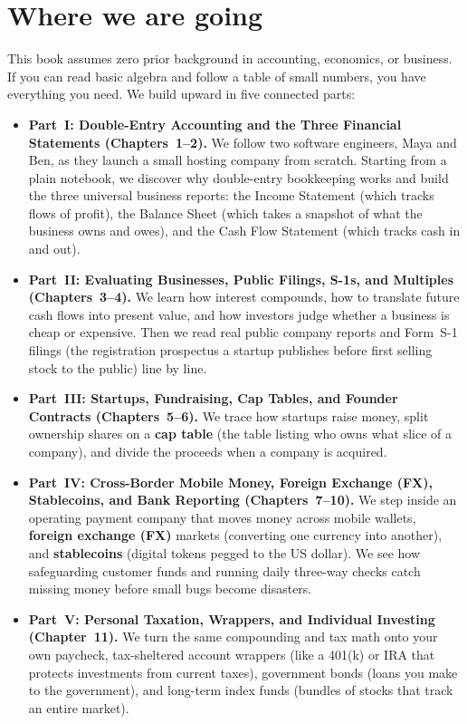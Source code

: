 \section*{Where we are going}

This book assumes zero prior background in accounting, economics, or business. If you can read basic algebra and follow a table of small numbers, you have everything you need. We build upward in five connected parts:

\begin{itemize}
  \item \textbf{Part~I: Double-Entry Accounting and the Three Financial Statements (Chapters~1--2).} We follow two software engineers, Maya and Ben, as they launch a small hosting company from scratch. Starting from a plain notebook, we discover why double-entry bookkeeping works and build the three universal business reports: the Income Statement (which tracks flows of profit), the Balance Sheet (which takes a snapshot of what the business owns and owes), and the Cash Flow Statement (which tracks cash in and out).
  \item \textbf{Part~II: Evaluating Businesses, Public Filings, S-1s, and Multiples (Chapters~3--4).} We learn how interest compounds, how to translate future cash flows into present value, and how investors judge whether a business is cheap or expensive. Then we read real public company reports and Form~S-1 filings (the registration prospectus a startup publishes before first selling stock to the public) line by line.
  \item \textbf{Part~III: Startups, Fundraising, Cap Tables, and Founder Contracts (Chapters~5--6).} We trace how startups raise money, split ownership shares on a \textbf{cap table} (the table listing who owns what slice of a company), and divide the proceeds when a company is acquired.
  \item \textbf{Part~IV: Cross-Border Mobile Money, Foreign Exchange (FX), Stablecoins, and Bank Reporting (Chapters~7--10).} We step inside an operating payment company that moves money across mobile wallets, \textbf{foreign exchange (FX)} markets (converting one currency into another), and \textbf{stablecoins} (digital tokens pegged to the US dollar). We see how safeguarding customer funds and running daily three-way checks catch missing money before small bugs become disasters.
  \item \textbf{Part~V: Personal Taxation, Wrappers, and Individual Investing (Chapter~11).} We turn the same compounding and tax math onto your own paycheck, tax-sheltered account wrappers (like a 401(k) or IRA that protects investments from current taxes), government bonds (loans you make to the government), and long-term index funds (bundles of stocks that track an entire market).
\end{itemize}

